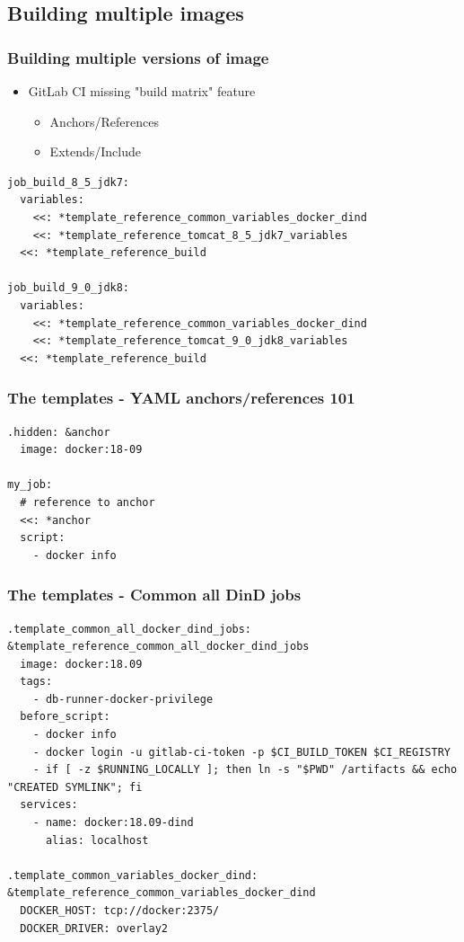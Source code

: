 \documentclass[14pt,aspectratio=169]{beamer}
\begin{document}
\subsection{Building multiple images}

\begin{frame}[fragile]
  \frametitle{Building multiple versions of image}
  \begin{itemize}
    \item GitLab CI missing "build matrix" feature
    \begin{itemize}
      \item Anchors/References
      \item Extends/Include
    \end{itemize}
  \end{itemize}
  \begin{verbatim}
job_build_8_5_jdk7:
  variables:
    <<: *template_reference_common_variables_docker_dind
    <<: *template_reference_tomcat_8_5_jdk7_variables
  <<: *template_reference_build

job_build_9_0_jdk8:
  variables:
    <<: *template_reference_common_variables_docker_dind
    <<: *template_reference_tomcat_9_0_jdk8_variables
  <<: *template_reference_build
  \end{verbatim}
\end{frame}

\begin{frame}[fragile]
  \frametitle{The templates - YAML anchors/references 101}
  \begin{verbatim}
.hidden: &anchor
  image: docker:18-09

my_job:
  # reference to anchor
  <<: *anchor
  script:
    - docker info
  \end{verbatim}
\end{frame}

\begin{frame}[fragile]
  \frametitle{The templates - Common all DinD jobs}
  \begin{verbatim}
.template_common_all_docker_dind_jobs: &template_reference_common_all_docker_dind_jobs
  image: docker:18.09
  tags:
    - db-runner-docker-privilege
  before_script:
    - docker info
    - docker login -u gitlab-ci-token -p $CI_BUILD_TOKEN $CI_REGISTRY
    - if [ -z $RUNNING_LOCALLY ]; then ln -s "$PWD" /artifacts && echo "CREATED SYMLINK"; fi
  services:
    - name: docker:18.09-dind
      alias: localhost

.template_common_variables_docker_dind: &template_reference_common_variables_docker_dind
  DOCKER_HOST: tcp://docker:2375/
  DOCKER_DRIVER: overlay2
  \end{verbatim}
\end{frame}
\end{document}
